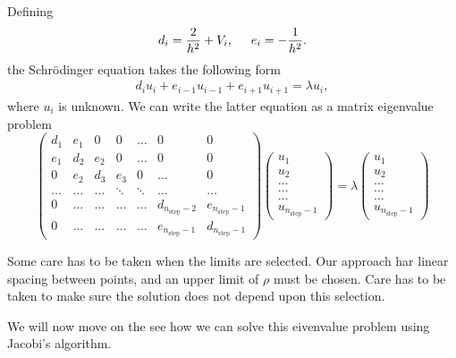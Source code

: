 \documentclass[11pt,a4paper,english,draft]{article}
\numberwithin{equation}{section}
\begin{document}
Defining 
\begin{gather}
   d_i=\frac{2}{h^2}+V_i, \hspace{0.5cm } e_i=-\frac{1}{h^2}.
\end{gather}
the Schrödinger equation takes the following form
\begin{gather}
d_iu_i+e_{i-1}u_{i-1}+e_{i+1}u_{i+1}  = \lambda u_i,
\end{gather}
where $u_i$ is unknown. We can write the 
latter equation as a matrix eigenvalue problem 
\begin{equation}
\begin{pmatrix} d_1 & e_1 & 0   & 0    & \dots  &0     & 0 \\
                e_1 & d_2 & e_2 & 0    & \dots  &0     &0 \\
                0   & e_2 & d_3 & e_3  &0       &\dots & 0\\
        \dots  & \dots & \dots & \ddots  &\ddots      &\dots & \dots\\
 0   & \dots & \dots & \dots  &\dots  &d_{n_{\mathrm{step}}-2} & e_{n_{\mathrm{step}}-1}\\
 0   & \dots & \dots & \dots  &\dots       &e_{n_{\mathrm{step}}-1} & d_{n_{\mathrm{step}}-1}
             \end{pmatrix}
\begin{pmatrix} u_{1} \\
      u_{2} \\
      \dots\\ \dots\\ \dots\\
      u_{n_{\mathrm{step}}-1}
\end{pmatrix} 
= \lambda \begin{pmatrix} u_{1} \\
                          u_{2} \\
                          \dots\\ \dots\\ \dots\\
                          u_{n_{\mathrm{step}}-1}
             \end{pmatrix} 
      \label{eq:sematrix}
\end{equation} 

Some care has to be taken when the limits are selected. Our 
approach har linear spacing between points, and an upper limit 
of $\rho$ must be chosen. Care has to be taken to make sure the 
solution does not depend upon this selection.

We will now move on the see how we can solve this eivenvalue problem using Jacobi's algorithm. 
\end{document}
